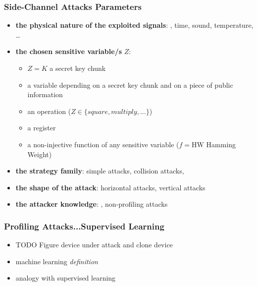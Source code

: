 \begin{frame}
\frametitle{Side-Channel Attacks Parameters}
\begin{itemize}
\item \textbf{the physical nature of the exploited signals}: , time, sound, temperature, \dots
\item \textbf{the chosen sensitive variable/s} $Z$:
\begin{itemize}
\item $Z = K$ a secret key chunk
\item {} a variable depending on a secret key chunk and on a piece of public information
\item an operation (\eg $Z \in \{ square, multiply, \dots\}$)
\item a register 
\item {} a non-injective function of any sensitive variable (\eg $f = \mathrm{HW}$ Hamming Weight)
\end{itemize}
\item \textbf{the strategy family}: simple attacks, collision attacks, 
\item \textbf{the shape of the attack}: horizontal attacks, vertical attacks
\item \textbf{the attacker knowledge}: , non-profiling attacks
\end{itemize}
\end{frame}




\begin{frame}
\frametitle{Profiling Attacks...Supervised Learning}
\begin{itemize}
\item TODO Figure device under attack and clone device 
\item machine learning \emph{definition}
\item analogy with supervised learning
\end{itemize}

\end{frame}



